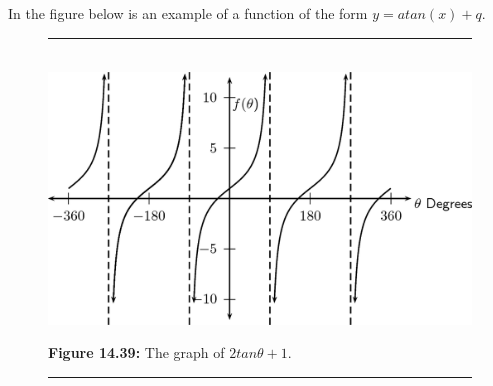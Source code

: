       \label{m39414*uid72}
            \nopagebreak
        \label{m39414*id90209}In the figure below is an example of a function of the form $y=atan\left(x\right)+q$.\par 
    \setcounter{subfigure}{0}
	\begin{figure}[H] %
    \begin{center}
    \rule[.1in]{\figurerulewidth}{.005in} \\
        \label{m39414*uid73!!!underscore!!!media}\label{m39414*uid73!!!underscore!!!printimage}\includegraphics{col11306.imgs/m39414_MG10C15_045.png} %
      \vspace{2pt}
    \vspace{\rubberspace}\par \begin{cnxcaption}
	  \small \textbf{Figure 14.39: }The graph of $2tan\theta +1$.
	\end{cnxcaption}
    \vspace{.1in}
    \rule[.1in]{\figurerulewidth}{.005in} \\
    \end{center}
 \end{figure}       
\label{m39414*secfhsst!!!underscore!!!id3205}
            \nopagebreak
